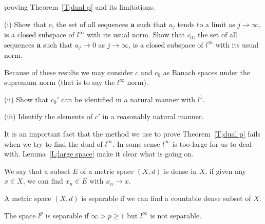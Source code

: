 proving Theorem~\ref{T;dual p} and its limitations.
\begin{exercise}\label{E;dual $c$} 
(i) Show that $c$, the set of all sequences 
${\mathbf a}$ such that $a_{j}$ tends to a limit 
as $j\rightarrow\infty$, is a closed subspace of
$l^{\infty}$ with its usual norm. Show that $c_{0}$, 
the set of all sequences 
${\mathbf a}$ such that $a_{j}\rightarrow 0$ 
as $j\rightarrow\infty$, is a closed subspace of
$l^{\infty}$ with its usual norm.

Because of these results we may consider
$c$ and $c_{0}$ as Banach spaces under the supremum norm
(that is to say the $l^{\infty}$ norm).

(ii) Show that $c_{0}'$ can be identified in a natural manner
with $l^{1}$.

(iii) Identify the elements of $c'$ in a reasonably
natural manner.
\end{exercise}
It is an important fact that the method we use
to prove Theorem~\ref{T;dual p} fails when we
try to find the dual of $l^{\infty}$.
In some sense $l^{\infty}$ is too large
for us to deal with. Lemma~\ref{L;large space}
make it clear what is going on.

\begin{definition}\label{def:dense} 
We say that a subset $E$ of a metric space $(X,d)$ is dense in $X$, if given any $x\in X$, we can find $x_{n}\in E$  with $x_{n}\rightarrow x$.
\end{definition}

\begin{definition}\label{def:seperable}
A metric space $(X,d)$ is separable if we can find a countable dense subset of $X$.
\end{definition}

\begin{lemma}\label{L;large space}
The space $l^{p}$ is separable if $\infty>p\geq 1$
but $l^{\infty}$ is not separable.
\end{lemma}  
